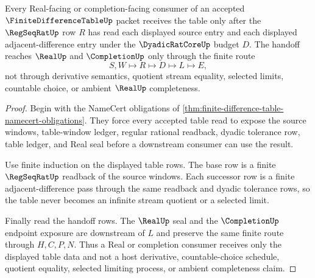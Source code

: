 \begin{theorem}
\label{thm:finite-difference-table-regseqrat-handoff}
Every Real-facing or completion-facing consumer of an accepted $\FiniteDifferenceTableUp$ packet receives the table only after the $\RegSeqRatUp$ row $R$ has read each displayed source entry and each displayed adjacent-difference entry under the $\DyadicRatCoreUp$ budget $D$. The handoff reaches $\RealUp$ and $\CompletionUp$ only through the finite route
$$
S,W \longmapsto R \longmapsto D \longmapsto L \longmapsto E,
$$
not through derivative semantics, quotient stream equality, selected limits, countable choice, or ambient $\RealUp$ completeness.
\end{theorem}
\begin{proof}
Begin with the NameCert obligations of \autoref{thm:finite-difference-table-namecert-obligations}. They force every accepted table read to expose the source windows, table-window ledger, regular rational readback, dyadic tolerance row, table ledger, and Real seal before a downstream consumer can use the result.

Use finite induction on the displayed table rows. The base row is a finite $\RegSeqRatUp$ readback of the source windows. Each successor row is a finite adjacent-difference pass through the same readback and dyadic tolerance rows, so the table never becomes an infinite stream quotient or a selected limit.

Finally read the handoff rows. The $\RealUp$ seal and the $\CompletionUp$ endpoint exposure are downstream of $L$ and preserve the same finite route through $H,C,P,N$. Thus a Real or completion consumer receives only the displayed table data and not a host derivative, countable-choice schedule, quotient equality, selected limiting process, or ambient completeness claim.
\end{proof}

